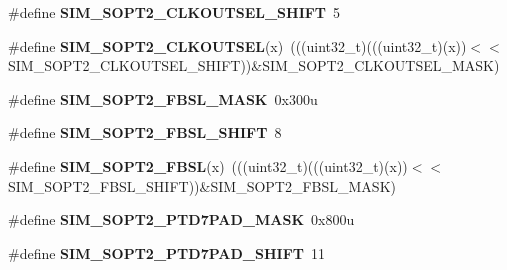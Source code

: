 \begin{DoxyCompactItemize}
\item 
\#define {\bfseries S\+I\+M\+\_\+\+S\+O\+P\+T2\+\_\+\+C\+L\+K\+O\+U\+T\+S\+E\+L\+\_\+\+S\+H\+I\+FT}~5\hypertarget{group__SIM__Register__Masks_ga520c9a255ff79372237f5f332f749112}{}\label{group__SIM__Register__Masks_ga520c9a255ff79372237f5f332f749112}

\item 
\#define {\bfseries S\+I\+M\+\_\+\+S\+O\+P\+T2\+\_\+\+C\+L\+K\+O\+U\+T\+S\+EL}(x)~(((uint32\+\_\+t)(((uint32\+\_\+t)(x))$<$$<$S\+I\+M\+\_\+\+S\+O\+P\+T2\+\_\+\+C\+L\+K\+O\+U\+T\+S\+E\+L\+\_\+\+S\+H\+I\+FT))\&S\+I\+M\+\_\+\+S\+O\+P\+T2\+\_\+\+C\+L\+K\+O\+U\+T\+S\+E\+L\+\_\+\+M\+A\+SK)\hypertarget{group__SIM__Register__Masks_ga34712f0ffce6dca092bd902ef7eb783f}{}\label{group__SIM__Register__Masks_ga34712f0ffce6dca092bd902ef7eb783f}

\item 
\#define {\bfseries S\+I\+M\+\_\+\+S\+O\+P\+T2\+\_\+\+F\+B\+S\+L\+\_\+\+M\+A\+SK}~0x300u\hypertarget{group__SIM__Register__Masks_ga27b0cb220aaf94e8d04795bd682ebd78}{}\label{group__SIM__Register__Masks_ga27b0cb220aaf94e8d04795bd682ebd78}

\item 
\#define {\bfseries S\+I\+M\+\_\+\+S\+O\+P\+T2\+\_\+\+F\+B\+S\+L\+\_\+\+S\+H\+I\+FT}~8\hypertarget{group__SIM__Register__Masks_ga7077057e2a7f0841d8151d2703d85f16}{}\label{group__SIM__Register__Masks_ga7077057e2a7f0841d8151d2703d85f16}

\item 
\#define {\bfseries S\+I\+M\+\_\+\+S\+O\+P\+T2\+\_\+\+F\+B\+SL}(x)~(((uint32\+\_\+t)(((uint32\+\_\+t)(x))$<$$<$S\+I\+M\+\_\+\+S\+O\+P\+T2\+\_\+\+F\+B\+S\+L\+\_\+\+S\+H\+I\+FT))\&S\+I\+M\+\_\+\+S\+O\+P\+T2\+\_\+\+F\+B\+S\+L\+\_\+\+M\+A\+SK)\hypertarget{group__SIM__Register__Masks_ga0ac5747a6f12a63218b75398d10d4af1}{}\label{group__SIM__Register__Masks_ga0ac5747a6f12a63218b75398d10d4af1}

\item 
\#define {\bfseries S\+I\+M\+\_\+\+S\+O\+P\+T2\+\_\+\+P\+T\+D7\+P\+A\+D\+\_\+\+M\+A\+SK}~0x800u\hypertarget{group__SIM__Register__Masks_gaf295c85205620f0ece4cf7a888fc298f}{}\label{group__SIM__Register__Masks_gaf295c85205620f0ece4cf7a888fc298f}

\item 
\#define {\bfseries S\+I\+M\+\_\+\+S\+O\+P\+T2\+\_\+\+P\+T\+D7\+P\+A\+D\+\_\+\+S\+H\+I\+FT}~11\hypertarget{group__SIM__Register__Masks_ga82543a91a19387f58f922371b4b5cc95}{}\label{group__SIM__Register__Masks_ga82543a91a19387f58f922371b4b5cc95}


\end{DoxyCompactItemize}
